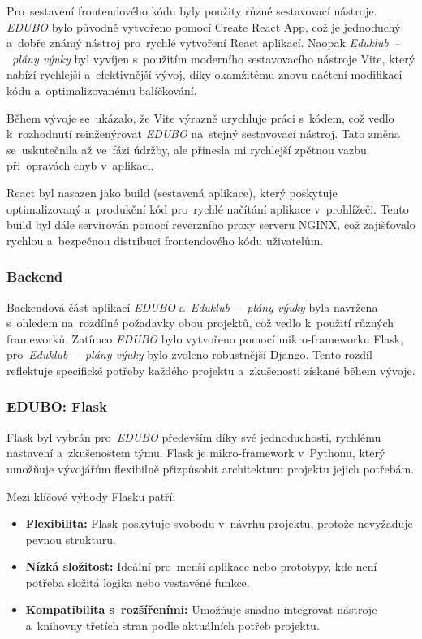 \documentclass[male,czech,api_bc]{kitheses}
\begin{document}
Pro~sestavení frontendového kódu byly použity různé sestavovací nástroje. \textit{EDUBO} bylo původně vytvořeno pomocí Create React App, což je jednoduchý a~dobře známý nástroj pro~rychlé vytvoření React aplikací. Naopak \textit{Eduklub~--~plány výuky} byl vyvíjen s~použitím moderního sestavovacího nástroje Vite, který nabízí rychlejší a~efektivnější vývoj, díky okamžitému znovu načtení modifikací kódu a~optimalizovanému balíčkování.

Během vývoje se~ukázalo, že Vite výrazně urychluje práci s~kódem, což vedlo k~rozhodnutí reinženýrovat \textit{EDUBO} na~stejný sestavovací nástroj. Tato změna se~uskutečnila až ve~fázi údržby, ale přinesla mi rychlejší zpětnou vazbu při~opravách chyb v~aplikaci.

React byl nasazen jako build (sestavená aplikace), který poskytuje optimalizovaný a~produkční kód pro~rychlé načítání aplikace v~prohlížeči. Tento build byl dále servírován pomocí reverzního proxy serveru NGINX, což zajišťovalo rychlou a~bezpečnou distribuci frontendového kódu uživatelům.

\subsubsection{Backend}

Backendová část aplikací \textit{EDUBO} a~\textit{Eduklub~--~plány výuky} byla navržena s~ohledem na~rozdílné požadavky obou projektů, což vedlo k~použití různých frameworků. Zatímco \textit{EDUBO} bylo vytvořeno pomocí mikro-frameworku Flask, pro~\textit{Eduklub~--~plány výuky} bylo zvoleno robustnější Django. Tento rozdíl reflektuje specifické potřeby každého projektu a~zkušenosti získané během vývoje.

\subsubsection{EDUBO: Flask}

Flask byl vybrán pro~\textit{EDUBO} především díky své jednoduchosti, rychlému nastavení a~zkušenostem týmu. Flask je mikro-framework v~Pythonu, který umožňuje vývojářům flexibilně přizpůsobit architekturu projektu jejich potřebám.

Mezi klíčové výhody Flasku patří:
\begin{itemize}
	\item \textbf{Flexibilita:} Flask poskytuje svobodu v~návrhu projektu, protože nevyžaduje pevnou strukturu.
	\item \textbf{Nízká složitost:} Ideální pro~menší aplikace nebo prototypy, kde není potřeba složitá logika nebo vestavěné funkce.
	\item \textbf{Kompatibilita s~rozšířeními:} Umožňuje snadno integrovat nástroje a~knihovny třetích stran podle aktuálních potřeb projektu.
\end{itemize}
\end{document}
